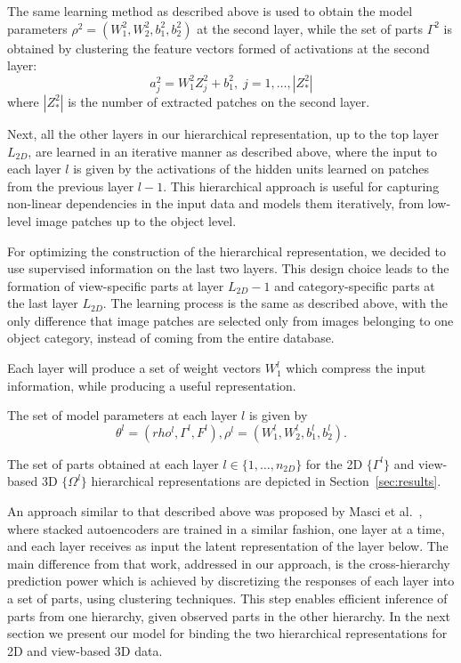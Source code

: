\documentclass[conference]{IEEEtran}
\begin{document}
The same learning method as described above is used to obtain the model parameters $\rho^2=(W_1^2,W_2^2,b_1^2,b_2^2)$ at the second layer, while the set of parts $\Gamma^{2}$ is obtained by clustering the feature vectors formed of activations at the second layer:
\begin{equation}
a_j^2=W_1^2Z_j^2+b_1^2, \;j=1,\ldots,|Z_*^2|
\end{equation}
where $|Z_*^2|$ is the number of extracted patches on the second layer.

Next, all the other layers in our hierarchical representation, up to the top layer $L_{2D}$, are learned in an iterative manner as described above, where the input to each layer $l$ is given by the activations of the hidden units learned on patches from the previous layer $l-1$. This hierarchical approach is useful for capturing non-linear dependencies in the input data and models them iteratively, from low-level image patches up to the object level.

For optimizing the construction of the hierarchical representation, we decided to use supervised information on the last two layers. This design choice leads to the formation of view-specific parts at layer $L_{2D}-1$ and category-specific parts at the last layer $L_{2D}$. The learning process is the same as described above, with the only difference that image patches are selected only from images belonging to one object category, instead of coming from the entire database.    

Each layer will produce a set of weight vectors $W_1^l$ which compress the input information, while producing a useful representation. 

The set of model parameters at each layer $l$ is  given by
\begin{equation}
\theta^l = (rho^l,\Gamma^l,F^l),
\rho^l=(W_1^l,W_2^l,b_1^l,b_2^l).
\end{equation}

The set of parts obtained at each layer $l\in\{1,\ldots,n_{2D}\}$ for the 2D $\{\Gamma^l\}$ and view-based 3D $\{\Omega^l\}$ hierarchical representations are depicted in Section~\ref{sec:results}.

An approach similar to that described above was proposed by Masci et al.~\cite{Masci2011}, where stacked autoencoders are trained in a similar fashion, one layer at a time, and each layer receives as input the latent representation of the layer below. The main difference from that work, addressed in our approach, is the cross-hierarchy prediction power which is achieved by discretizing the responses of each layer into a set of parts, using clustering techniques. This step enables efficient inference of parts from one hierarchy, given observed parts in the other hierarchy. In the next section we present our model for binding the two hierarchical representations for 2D and view-based 3D data.
 
\end{document}
